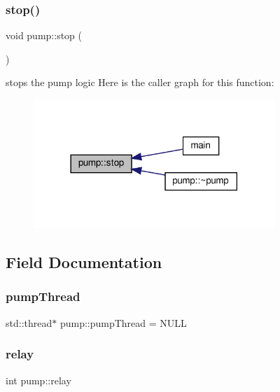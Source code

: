 \subsubsection{\texorpdfstring{stop()}{stop()}}
{\footnotesize\ttfamily void pump\+::stop (\begin{DoxyParamCaption}{ }\end{DoxyParamCaption})}

stops the pump logic Here is the caller graph for this function\+:
\nopagebreak
\begin{figure}[H]
\begin{center}
\leavevmode
\includegraphics[width=258pt]{classpump_add87c3bee2a6faba0404e9ce115d0d17_icgraph}
\end{center}
\end{figure}


\subsection{Field Documentation}
\mbox{\label{classpump_a52d8740c4bc37939ead02e93a6dfdb68}} 
\subsubsection{\texorpdfstring{pump\+Thread}{pumpThread}}
{\footnotesize\ttfamily std\+::thread$\ast$ pump\+::pump\+Thread = N\+U\+LL\hspace{0.3cm}{\ttfamily [private]}}

\mbox{\label{classpump_a31d0a2af60c2193f5e5a6e4e51c56ec6}} 
\subsubsection{\texorpdfstring{relay}{relay}}
{\footnotesize\ttfamily int pump\+::relay\hspace{0.3cm}{\ttfamily [private]}}


